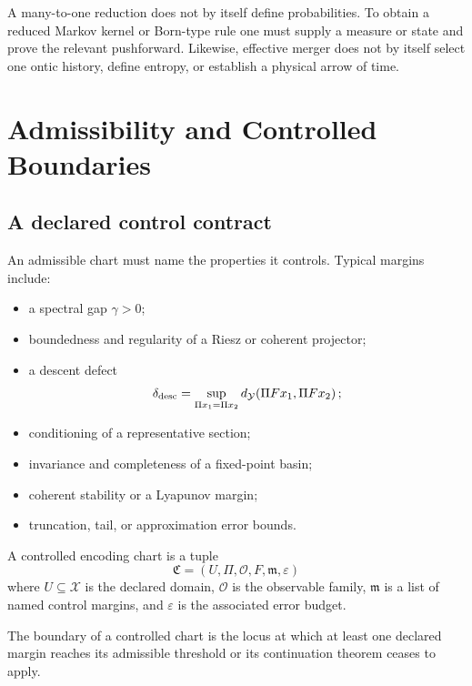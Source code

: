 \documentclass[11pt]{article}
\begin{document}
A many-to-one reduction does not by itself define probabilities.  To obtain a
reduced Markov kernel or Born-type rule one must supply a measure or state and
prove the relevant pushforward.  Likewise, effective merger does not by itself
select one ontic history, define entropy, or establish a physical arrow of
time.

\section{Admissibility and Controlled Boundaries}

\subsection{A declared control contract}

An admissible chart must name the properties it controls.  Typical margins
include:
\begin{itemize}
\item a spectral gap $\gamma>0$;
\item boundedness and regularity of a Riesz or coherent projector;
\item a descent defect
\[
\delta_{\rm desc}
=\sup_{\Pi x_1=\Pi x_2}
d_{\mathcal Y}\!\left(\Pi Fx_1,\Pi Fx_2\right);
\]
\item conditioning of a representative section;
\item invariance and completeness of a fixed-point basin;
\item coherent stability or a Lyapunov margin;
\item truncation, tail, or approximation error bounds.
\end{itemize}

\begin{definition}
A controlled encoding chart is a tuple
\[
\mathfrak C=(U,\Pi,\mathcal O,F,\mathfrak m,\varepsilon)
\]
where $U\subseteq\mathcal X$ is the declared domain, $\mathcal O$ is the
observable family, $\mathfrak m$ is a list of named control margins, and
$\varepsilon$ is the associated error budget.
\end{definition}

\begin{definition}
The boundary of a controlled chart is the locus at which at least one declared
margin reaches its admissible threshold or its continuation theorem ceases to
apply.
\end{definition}
\end{document}
